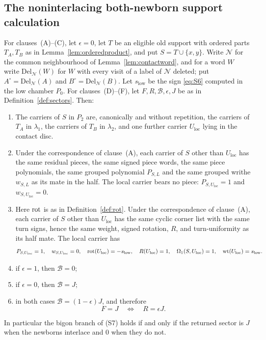 \subsection{The noninterlacing both-newborn support calculation}\label{sec:niboth}

\begin{proposition}\label{prop:sectortarget}
For clauses~(A)--(C), let $\epsilon=0$, let $T$ be an eligible old support
with ordered parts $T_A,T_B$ as in Lemma~\ref{lem:orderedproduct}, and put
$S=T\cup\{x,y\}$. Write $\mathcal N$ for the common neighbourhood of
Lemma~\ref{lem:contactword}, and for a word $W$ write
$\mathrm{Del}_{\mathcal N}(W)$ for $W$ with every visit of a label of
$\mathcal N$ deleted; put $A^{\circ}=\mathrm{Del}_{\mathcal N}(A)$ and
$B^{\circ}=\mathrm{Del}_{\mathcal N}(B)$. Let $s_{\mathrm{low}}$ be the sign
\eqref{eq:S6} computed in the low chamber $P_0$. For clauses~(D)--(F), let
$F,R,\mathcal B,\epsilon,J$ be as in Definition~\ref{def:sectors}. Then:
\begin{enumerate}
\item[(A)] The carriers of $S$ in $P_2$ are, canonically and without repetition, the
carriers of $T_A$ in $\lambda_1$, the carriers of $T_B$ in $\lambda_2$, and one
further carrier $U_{\mathrm{loc}}$ lying in the contact disc.
\item[(B)] Under the correspondence of clause~(A), each carrier of $S$
other than $U_{\mathrm{loc}}$ has the same residual pieces, the same signed piece words,
the same piece polynomials, the same grouped polynomial $P_{S,L}$ and the same
grouped writhe $w_{S,L}$ as its mate in the half. The local carrier bears no
piece: $P_{S,U_{\mathrm{loc}}}=1$ and $w_{S,U_{\mathrm{loc}}}=0$.
\item[(C)] Here $\operatorname{rot}$ is as in Definition~\ref{def:rot}.
Under the correspondence of clause~(A), each carrier of $S$ other than $U_{\mathrm{loc}}$ has the same cyclic
corner list with the same turn signs, hence the same weight, signed rotation,
$R$, and turn-uniformity as its half mate. The local carrier has
\[
   P_{S,U_{\mathrm{loc}}}=1,\quad w_{S,U_{\mathrm{loc}}}=0,\quad \operatorname{rot}(U_{\mathrm{loc}})=-s_{\mathrm{low}},\quad R(U_{\mathrm{loc}})=1,\quad
   \Omega_1(S,U_{\mathrm{loc}})=1,\quad \mathrm{wt}(U_{\mathrm{loc}})=s_{\mathrm{low}} .
\]
\item[(D)] if $\epsilon=1$, then $\mathcal B=0$;
\item[(E)] if $\epsilon=0$, then $\mathcal B=J$;
\item[(F)] in both cases $\mathcal B=(1-\epsilon)J$, and therefore
\[
   F=J\quad\Longleftrightarrow\quad R=\epsilon J .
\]
\end{enumerate}
In particular the bigon branch of (S7) holds if and only if the returned sector
is $J$ when the newborns interlace and $0$ when they do not.
\end{proposition}
